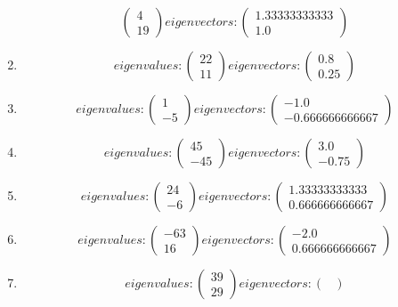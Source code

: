\documentclass{article}%
\begin{document}
\begin{enumerate}[label=\arabic*)]
\[\begin{pmatrix}
4\\%
19%
\end{pmatrix} eigenvectors: \begin{pmatrix}%
1.33333333333\\%
1.0%
\end{pmatrix}%
\]%
\item%
\[%
eigenvalues: \begin{pmatrix}%
22\\%
11%
\end{pmatrix} eigenvectors: \begin{pmatrix}%
0.8\\%
0.25%
\end{pmatrix}%
\]%
\item%
\[%
eigenvalues: \begin{pmatrix}%
1\\%
-5%
\end{pmatrix} eigenvectors: \begin{pmatrix}%
-1.0\\%
-0.666666666667%
\end{pmatrix}%
\]%
\item%
\[%
eigenvalues: \begin{pmatrix}%
45\\%
-45%
\end{pmatrix} eigenvectors: \begin{pmatrix}%
3.0\\%
-0.75%
\end{pmatrix}%
\]%
\item%
\[%
eigenvalues: \begin{pmatrix}%
24\\%
-6%
\end{pmatrix} eigenvectors: \begin{pmatrix}%
1.33333333333\\%
0.666666666667%
\end{pmatrix}%
\]%
\item%
\[%
eigenvalues: \begin{pmatrix}%
-63\\%
16%
\end{pmatrix} eigenvectors: \begin{pmatrix}%
-2.0\\%
0.666666666667%
\end{pmatrix}%
\]%
\item%
\[%
eigenvalues: \begin{pmatrix}%
39\\%
29%
\end{pmatrix} eigenvectors: \begin{pmatrix}%

\end{pmatrix}\]
\end{enumerate}
\end{document}
